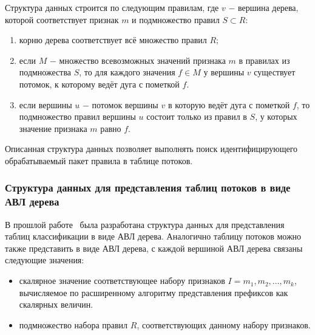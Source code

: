 \documentclass[oneside,final,12pt]{extarticle}
\begin{document}
                Структура данных строится по следующим правилам, где \(v\) $-$ вершина дерева, которой соответствует признак \(m\) и подмножество правил \(S \subset R\):
                \begin{enumerate}
                    \item корню дерева соответствует всё множество правил \(R\);
                    \item если \(M\) $-$ множество всевозможных значений признака \(m\) в правилах из подмножества \(S\), то для каждого значения \(f \in M\)
                        у вершины \(v\) существует потомок, к которому ведёт дуга с пометкой \(f\).
                    \item если вершины \(u\) $-$ потомок вершины \(v\) в которую ведёт дуга с пометкой \(f\), то подмножество правил вершины \(u\) состоит только из
                        правил в \(S\), у которых значение признака \(m\) равно \(f\).
                \end{enumerate}

                Описанная структура данных позволяет выполнять поиск идентифицирующего обрабатываемый пакет правила в таблице потоков.
            \subsubsection{Структура данных для представления таблиц потоков в виде АВЛ дерева}
                В прошлой работе~\cite{nik_avl} была разработана структура данных для представления таблиц классификации в виде АВЛ дерева.
                Аналогично таблицу потоков можно также представить в виде АВЛ дерева, с каждой вершиной АВЛ дерева связаны следующие значения:
                \begin{itemize}
                    \item скалярное значение соответствующее набору признаков \(I = {m_1, m_2, \ldots, m_k}\), вычисляемое по расширенному алгоритму представления префиксов 
                        как скалярных величин.
                    \item подмножество набора правил \(R\), соответствующих данному набору признаков.
                \end{itemize}
\end{document}
